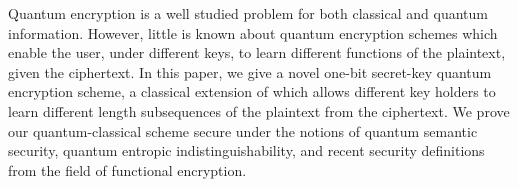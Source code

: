 
Quantum encryption is a well studied problem for both classical and quantum information. However, little is known about quantum encryption schemes which enable the user, under different keys, to learn different functions of the plaintext, given the ciphertext. In this paper, we give a novel one-bit secret-key quantum encryption scheme, a classical extension of which allows different key holders to learn different length subsequences of the plaintext from the ciphertext. We prove our quantum-classical scheme secure under the notions of quantum semantic security, quantum entropic indistinguishability, and recent security definitions from the field of functional encryption.